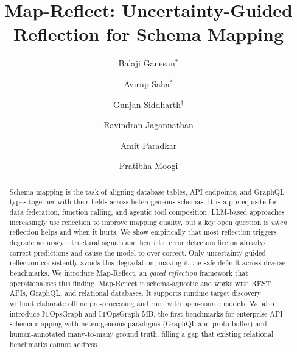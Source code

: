 \documentclass[sigconf, nonacm]{acmart}
\begin{document}
\title{Map-Reflect: Uncertainty-Guided Reflection for Schema Mapping}

\author{Balaji Ganesan$^{*}$}

\author{Avirup Saha$^{*}$}

\author{Gunjan Siddharth$^{\dagger}$}

\author{Ravindran Jagannathan}

\author{Amit Paradkar}

\author{Pratibha Moogi} 


\begin{abstract}
Schema mapping is the task of aligning database tables, API endpoints, and GraphQL types together with their fields across heterogeneous schemas. It is a prerequisite for data federation, function calling, and agentic tool composition. LLM-based approaches increasingly use reflection to improve mapping quality, but a key open question is \emph{when} reflection helps and when it hurts. We show empirically that most reflection triggers degrade accuracy: structural signals and heuristic error detectors fire on already-correct predictions and cause the model to over-correct. Only uncertainty-guided reflection consistently avoids this degradation, making it the safe default across diverse benchmarks. We introduce Map-Reflect, an \emph{gated reflection} framework that operationalises this finding. Map-Reflect is schema-agnostic and works with REST APIs, GraphQL, and relational databases. It supports runtime target discovery without elaborate offline pre-processing and runs with open-source models. We also introduce ITOpsGraph and ITOpsGraph-MB, the first benchmarks for enterprise API schema mapping with heterogeneous paradigms (GraphQL and proto buffer) and human-annotated many-to-many ground truth, filling a gap that existing relational benchmarks cannot address.
\end{abstract}
\end{document}
